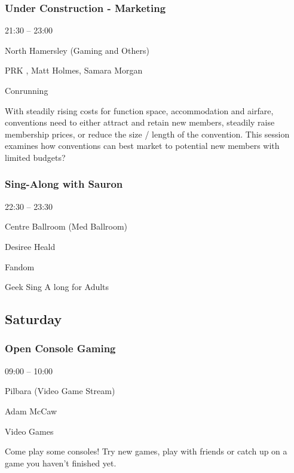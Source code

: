 \documentclass{scrreprt}
\begin{document}
\begin{multicols}{2}
\subsubsection*{Under Construction - Marketing}\begin{description}
\setlength{\itemsep}{0pt}
\setlength{\parsep}{0pt}
\setlength{\parskip}{0pt}
\item[Time:]{21:30 -- 23:00}
\item[Venue:]{North Hamersley (Gaming and Others)}
\item[People:]{PRK , Matt Holmes, Samara Morgan}
\item[Tags:]{Conrunning}\end{description}
With steadily rising costs for function space, accommodation and airfare, conventions need to either attract and retain new members, steadily raise membership prices, or reduce the size / length of the convention. This session examines how conventions can best market to potential new members with limited budgets?
\subsubsection*{Sing-Along with Sauron}\begin{description}
\setlength{\itemsep}{0pt}
\setlength{\parsep}{0pt}
\setlength{\parskip}{0pt}
\item[Time:]{22:30 -- 23:30}
\item[Venue:]{Centre Ballroom (Med Ballroom)}
\item[People:]{Desiree Heald}
\item[Tags:]{Fandom}\end{description}
Geek Sing A long for Adults
\subsection*{Saturday}\subsubsection*{Open Console Gaming}\begin{description}
\setlength{\itemsep}{0pt}
\setlength{\parsep}{0pt}
\setlength{\parskip}{0pt}
\item[Time:]{09:00 -- 10:00}
\item[Venue:]{Pilbara (Video Game Stream)}
\item[People:]{Adam McCaw}
\item[Tags:]{Video Games}\end{description}
Come play some consoles! Try new games, play with friends or catch up on a game you haven't finished yet.

\end{multicols}
\end{document}
